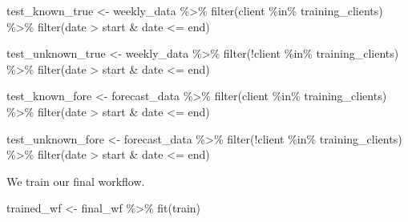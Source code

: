 \documentclass[
]{article}
\newenvironment{Shaded}{\begin{snugshade}}{\end{snugshade}}
\newcommand{\FunctionTok}[1]{\textcolor[rgb]{0.00,0.00,0.00}{#1}}
\newcommand{\NormalTok}[1]{#1}
\newcommand{\OtherTok}[1]{\textcolor[rgb]{0.56,0.35,0.01}{#1}}
\newcommand{\SpecialCharTok}[1]{\textcolor[rgb]{0.00,0.00,0.00}{#1}}
\begin{document}
\begin{Shaded}
\begin{Highlighting}[]
\NormalTok{test\_known\_true }\OtherTok{\textless{}{-}}
\NormalTok{  weekly\_data }\SpecialCharTok{\%\textgreater{}\%}
  \FunctionTok{filter}\NormalTok{(client }\SpecialCharTok{\%in\%}\NormalTok{ training\_clients) }\SpecialCharTok{\%\textgreater{}\%}
  \FunctionTok{filter}\NormalTok{(date }\SpecialCharTok{\textgreater{}}\NormalTok{ start }\SpecialCharTok{\&}\NormalTok{ date }\SpecialCharTok{\textless{}=}\NormalTok{ end)}

\NormalTok{test\_unknown\_true }\OtherTok{\textless{}{-}}
\NormalTok{  weekly\_data }\SpecialCharTok{\%\textgreater{}\%}
  \FunctionTok{filter}\NormalTok{(}\SpecialCharTok{!}\NormalTok{client }\SpecialCharTok{\%in\%}\NormalTok{ training\_clients) }\SpecialCharTok{\%\textgreater{}\%}
  \FunctionTok{filter}\NormalTok{(date }\SpecialCharTok{\textgreater{}}\NormalTok{ start }\SpecialCharTok{\&}\NormalTok{ date }\SpecialCharTok{\textless{}=}\NormalTok{ end)}

\NormalTok{test\_known\_fore }\OtherTok{\textless{}{-}}
\NormalTok{  forecast\_data }\SpecialCharTok{\%\textgreater{}\%}
  \FunctionTok{filter}\NormalTok{(client }\SpecialCharTok{\%in\%}\NormalTok{ training\_clients) }\SpecialCharTok{\%\textgreater{}\%}
  \FunctionTok{filter}\NormalTok{(date }\SpecialCharTok{\textgreater{}}\NormalTok{ start }\SpecialCharTok{\&}\NormalTok{ date }\SpecialCharTok{\textless{}=}\NormalTok{ end)}

\NormalTok{test\_unknown\_fore }\OtherTok{\textless{}{-}}
\NormalTok{  forecast\_data }\SpecialCharTok{\%\textgreater{}\%}
  \FunctionTok{filter}\NormalTok{(}\SpecialCharTok{!}\NormalTok{client }\SpecialCharTok{\%in\%}\NormalTok{ training\_clients) }\SpecialCharTok{\%\textgreater{}\%}
  \FunctionTok{filter}\NormalTok{(date }\SpecialCharTok{\textgreater{}}\NormalTok{ start }\SpecialCharTok{\&}\NormalTok{ date }\SpecialCharTok{\textless{}=}\NormalTok{ end)}
\end{Highlighting}
\end{Shaded}

We train our final workflow.

\begin{Shaded}
\begin{Highlighting}[]
\NormalTok{trained\_wf }\OtherTok{\textless{}{-}}
\NormalTok{  final\_wf }\SpecialCharTok{\%\textgreater{}\%}
  \FunctionTok{fit}\NormalTok{(train)}
\end{Highlighting}
\end{Shaded}
\end{document}
